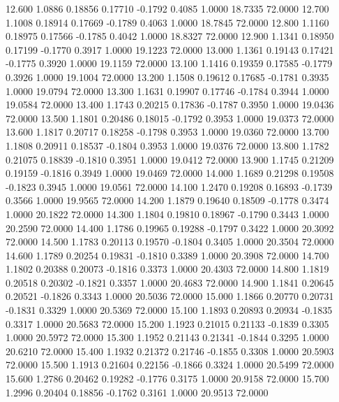   12.600   1.0886   0.18856   0.17710  -0.1792   0.4085   1.0000  18.7335  72.0000
  12.700   1.1008   0.18914   0.17669  -0.1789   0.4063   1.0000  18.7845  72.0000
  12.800   1.1160   0.18975   0.17566  -0.1785   0.4042   1.0000  18.8327  72.0000
  12.900   1.1341   0.18950   0.17199  -0.1770   0.3917   1.0000  19.1223  72.0000
  13.000   1.1361   0.19143   0.17421  -0.1775   0.3920   1.0000  19.1159  72.0000
  13.100   1.1416   0.19359   0.17585  -0.1779   0.3926   1.0000  19.1004  72.0000
  13.200   1.1508   0.19612   0.17685  -0.1781   0.3935   1.0000  19.0794  72.0000
  13.300   1.1631   0.19907   0.17746  -0.1784   0.3944   1.0000  19.0584  72.0000
  13.400   1.1743   0.20215   0.17836  -0.1787   0.3950   1.0000  19.0436  72.0000
  13.500   1.1801   0.20486   0.18015  -0.1792   0.3953   1.0000  19.0373  72.0000
  13.600   1.1817   0.20717   0.18258  -0.1798   0.3953   1.0000  19.0360  72.0000
  13.700   1.1808   0.20911   0.18537  -0.1804   0.3953   1.0000  19.0376  72.0000
  13.800   1.1782   0.21075   0.18839  -0.1810   0.3951   1.0000  19.0412  72.0000
  13.900   1.1745   0.21209   0.19159  -0.1816   0.3949   1.0000  19.0469  72.0000
  14.000   1.1689   0.21298   0.19508  -0.1823   0.3945   1.0000  19.0561  72.0000
  14.100   1.2470   0.19208   0.16893  -0.1739   0.3566   1.0000  19.9565  72.0000
  14.200   1.1879   0.19640   0.18509  -0.1778   0.3474   1.0000  20.1822  72.0000
  14.300   1.1804   0.19810   0.18967  -0.1790   0.3443   1.0000  20.2590  72.0000
  14.400   1.1786   0.19965   0.19288  -0.1797   0.3422   1.0000  20.3092  72.0000
  14.500   1.1783   0.20113   0.19570  -0.1804   0.3405   1.0000  20.3504  72.0000
  14.600   1.1789   0.20254   0.19831  -0.1810   0.3389   1.0000  20.3908  72.0000
  14.700   1.1802   0.20388   0.20073  -0.1816   0.3373   1.0000  20.4303  72.0000
  14.800   1.1819   0.20518   0.20302  -0.1821   0.3357   1.0000  20.4683  72.0000
  14.900   1.1841   0.20645   0.20521  -0.1826   0.3343   1.0000  20.5036  72.0000
  15.000   1.1866   0.20770   0.20731  -0.1831   0.3329   1.0000  20.5369  72.0000
  15.100   1.1893   0.20893   0.20934  -0.1835   0.3317   1.0000  20.5683  72.0000
  15.200   1.1923   0.21015   0.21133  -0.1839   0.3305   1.0000  20.5972  72.0000
  15.300   1.1952   0.21143   0.21341  -0.1844   0.3295   1.0000  20.6210  72.0000
  15.400   1.1932   0.21372   0.21746  -0.1855   0.3308   1.0000  20.5903  72.0000
  15.500   1.1913   0.21604   0.22156  -0.1866   0.3324   1.0000  20.5499  72.0000
  15.600   1.2786   0.20462   0.19282  -0.1776   0.3175   1.0000  20.9158  72.0000
  15.700   1.2996   0.20404   0.18856  -0.1762   0.3161   1.0000  20.9513  72.0000
